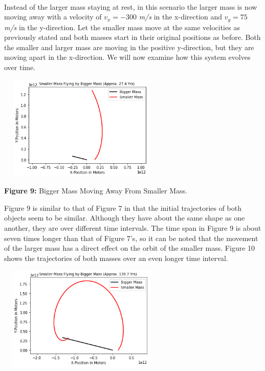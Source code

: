 \documentclass[]{article}
\begin{document}
\begin{multicols}{2}
\paragraph{}
\setlength{\parskip}{1em}
Instead of the larger mass staying at rest, in this scenario the larger mass is now moving away with a velocity of $v_{x}=-300$ \textit{m/s} in the x-direction and $v_{y}=75$ \textit{m/s} in the y-direction. Let the smaller mass move at the same velocities as previously stated and both masses start in their original positions as before. Both the smaller and larger mass are moving in the positive y-direction, but they are moving apart in the x-direction. We will now examine how this system evolves over time. 
\begin{center}
\includegraphics[width=8cm, height=5.0cm]{PHYS 342 FP 2-Body Fly By (3).png}
\caption{\small{\textbf{Figure 9:}} \tiny{Bigger Mass Moving Away From Smaller Mass.}}
\end{center}
Figure 9 is similar to that of Figure 7 in that the initial trajectories of both objects seem to be similar. Although they have about the same shape as one another, they are over different time intervals. The time span in Figure 9 is about seven times longer than that of Figure 7's, so it can be noted that the movement of the larger mass has a direct effect on the orbit of the smaller mass. Figure 10 shows the trajectories of both masses over an even longer time interval.
\begin{center}
\includegraphics[width=8cm, height=5.0cm]{PHYS 342 FP 2-Body Fly By (4).png}

\end{center}
\end{multicols}
\end{document}
